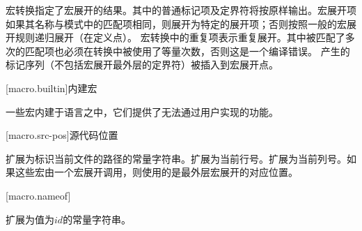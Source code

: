 \pnum
宏转换指定了宏展开的结果。其中的普通标记项及定界符将按原样输出。宏展开项如果其名称与模式中的匹配项相同，则展开为特定的展开项；否则按照一般的宏展开规则递归展开（在定义点）。
宏转换中的重复项表示重复展开。其中被匹配了多次的匹配项也必须在转换中被使用了等量次数，否则这是一个编译错误。
产生的标记序列（不包括宏展开最外层的定界符）被插入到宏展开点。

[macro.builtin]{内建宏}

\pnum
一些宏内建于语言之中，它们提供了无法通过用户实现的功能。

[macro.src-pos]{源代码位置}

\pnum
{}扩展为标识当前文件的路径的常量字符串。扩展为当前行号。扩展为当前列号。如果这些宏由一个宏展开调用，则使用的是最外层宏展开的对应位置。

[macro.nameof]{}

\pnum
{}扩展为值为$id$的常量字符串。